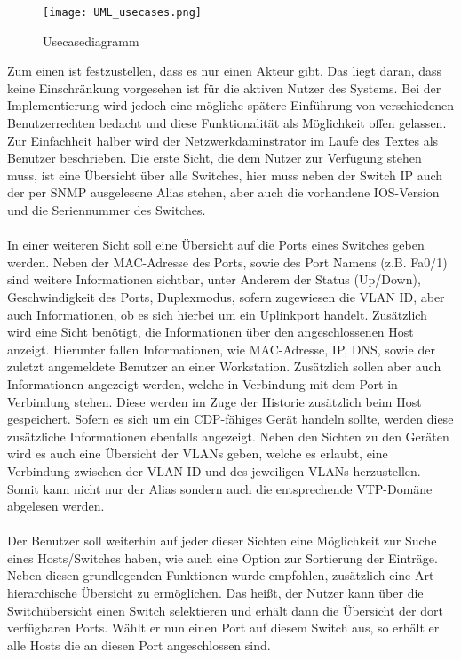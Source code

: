 \begin{figure}[H]
\centering
\texttt{[image: UML\_usecases.png]}
\caption{Usecasediagramm}
\label{fig:usecase001}
\end{figure}

Zum einen ist festzustellen, dass es nur einen Akteur gibt. Das liegt daran, dass keine Einschränkung vorgesehen ist für die aktiven Nutzer des Systems.
Bei der Implementierung wird jedoch eine mögliche spätere Einführung von verschiedenen Benutzerrechten bedacht und diese Funktionalität als Möglichkeit offen gelassen.
Zur Einfachheit halber wird der Netzwerkdaminstrator im Laufe des Textes als Benutzer beschrieben.
Die erste Sicht, die dem Nutzer zur Verfügung stehen muss, ist eine Übersicht über alle Switches, hier muss neben der Switch IP auch der per SNMP ausgelesene Alias stehen, aber auch die vorhandene IOS-Version und die Seriennummer des Switches.\\\\
In einer weiteren Sicht soll eine Übersicht auf die Ports eines Switches geben werden.
Neben der MAC-Adresse des Ports, sowie des Port Namens (z.B. Fa0/1) sind weitere Informationen sichtbar, unter Anderem der Status (Up/Down), Geschwindigkeit des Ports, Duplexmodus, sofern zugewiesen die VLAN ID, aber auch Informationen, ob es sich hierbei um ein Uplinkport handelt.
Zusätzlich wird eine Sicht benötigt, die Informationen über den angeschlossenen Host anzeigt.
Hierunter fallen Informationen, wie MAC-Adresse, IP, DNS, sowie der zuletzt angemeldete Benutzer an einer Workstation. Zusätzlich sollen aber auch Informationen angezeigt werden, welche in Verbindung mit dem Port in Verbindung stehen. Diese werden im Zuge der Historie zusätzlich beim Host gespeichert.
Sofern es sich um ein CDP-fähiges Gerät handeln sollte, werden diese zusätzliche Informationen ebenfalls angezeigt.
Neben den Sichten zu den Geräten wird es auch eine Übersicht der VLANs geben, welche es erlaubt, eine Verbindung zwischen der VLAN ID und des jeweiligen VLANs herzustellen.
Somit kann nicht nur der Alias sondern auch die entsprechende VTP-Domäne abgelesen werden.\\\\
Der Benutzer soll weiterhin auf jeder dieser Sichten eine Möglichkeit zur Suche eines Hosts/Switches haben, wie auch eine Option zur Sortierung der Einträge.
Neben diesen grundlegenden Funktionen wurde empfohlen, zusätzlich eine Art hierarchische Übersicht zu ermöglichen. Das heißt, der Nutzer kann über die Switchübersicht einen Switch selektieren und erhält dann die Übersicht der dort verfügbaren Ports. Wählt er nun einen Port auf diesem Switch aus, so erhält er alle Hosts die an diesen Port angeschlossen sind.
